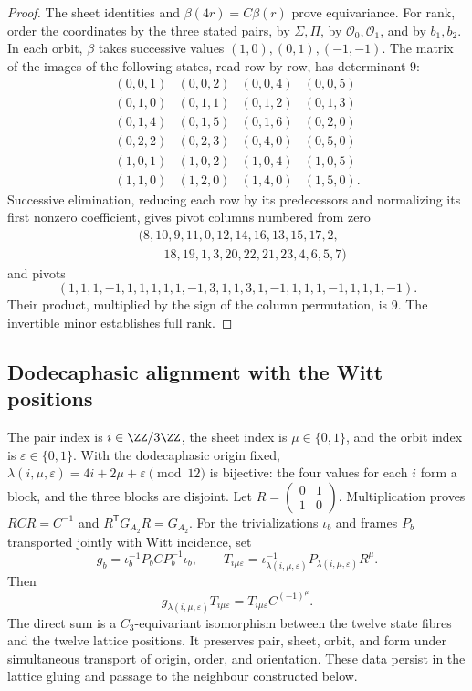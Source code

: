 \begin{proof}
The sheet identities and \(\beta(4r)=C\beta(r)\) prove
equivariance. For rank, order the coordinates by the three
stated pairs, by \(\Sigma,\Pi\), by \(\mathcal O_0,\mathcal O_1\),
and by \(b_1,b_2\). In each orbit, \(\beta\) takes successive values
\((1,0),(0,1),(-1,-1)\). The matrix of the images of the following states,
read row by row, has determinant \(9\):
\[
\begin{array}{rrrr}
(0,0,1)&(0,0,2)&(0,0,4)&(0,0,5)\\
(0,1,0)&(0,1,1)&(0,1,2)&(0,1,3)\\
(0,1,4)&(0,1,5)&(0,1,6)&(0,2,0)\\
(0,2,2)&(0,2,3)&(0,4,0)&(0,5,0)\\
(1,0,1)&(1,0,2)&(1,0,4)&(1,0,5)\\
(1,1,0)&(1,2,0)&(1,4,0)&(1,5,0).
\end{array}
\]
Successive elimination, reducing each row by its predecessors and
normalizing its first nonzero coefficient, gives pivot columns
numbered from zero
\[
\begin{split}
&(8,10,9,11,0,12,14,16,13,15,17,2,\\
&\hspace{2em}18,19,1,3,20,22,21,23,4,6,5,7)
\end{split}
\]
and pivots
\[
(1,1,1,-1,1,1,1,1,1,-1,3,1,1,3,1,-1,1,1,1,-1,1,1,1,-1).
\]
Their product, multiplied by the sign of the column permutation,
is \(9\). The invertible minor establishes full rank.
\end{proof}

\subsection{Dodecaphasic alignment with the Witt positions}
\label{nuclear:alineamiento-witt}
The pair index is \(i\in\ZZ/3\ZZ\), the sheet index is
\(\mu\in\{0,1\}\), and the orbit index is \(\varepsilon\in\{0,1\}\).
With the dodecaphasic origin fixed, \(\lambda(i,\mu,\varepsilon)
=4i+2\mu+\varepsilon\pmod{12}\) is bijective: the four values
for each \(i\) form a block, and the three blocks are disjoint.
Let \(R=\left(\begin{smallmatrix}0&1\\1&0\end{smallmatrix}\right)\).
Multiplication proves \(RCR=C^{-1}\) and
\(R^{\mathsf T}G_{A_2}R=G_{A_2}\). For the trivializations
\(\iota_b\) and frames \(P_b\) transported jointly with
Witt incidence, set
\[
g_b=\iota_b^{-1}P_bCP_b^{-1}\iota_b,\qquad
T_{i\mu\varepsilon}=\iota_{\lambda(i,\mu,\varepsilon)}^{-1}
P_{\lambda(i,\mu,\varepsilon)}R^\mu.
\]
Then
\[
g_{\lambda(i,\mu,\varepsilon)}T_{i\mu\varepsilon}
=T_{i\mu\varepsilon}C^{(-1)^\mu}.
\]
The direct sum is a \(C_3\)-equivariant isomorphism between the twelve
state fibres and the twelve lattice positions. It preserves pair,
sheet, orbit, and form under simultaneous transport of origin,
order, and orientation. These data persist in the lattice gluing
and passage to the neighbour constructed below.
